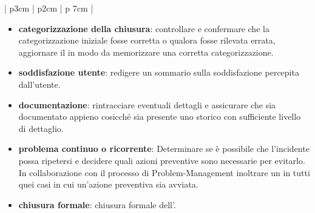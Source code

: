 \begin{center}
\begin{longtable}{| p{3cm} | p{2cm} | p {7cm} |}
\begin{itemize}
\item{\textbf{categorizzazione della chiusura}: controllare e confermare che la categorizzazione iniziale fosse corretta o qualora fosse rilevata errata, aggiornare il  in modo da memorizzare una corretta categorizzazione.}
\item{\textbf{soddisfazione utente}: redigere un sommario sulla soddisfazione percepita dall'utente.}
\item{\textbf{documentazione}: rintracciare eventuali dettagli e assicurare che  sia documentato appieno cosicché sia presente uno storico con sufficiente livello di dettaglio.}
\item{\textbf{problema continuo o ricorrente}: Determinare se è possibile che l'incidente possa ripetersi e decidere quali azioni preventive sono necessarie per evitarlo. In collaborazione con il processo di \ac{Problem-Management} inoltrare un  in tutti quei casi in cui un'azione preventiva sia avviata.}
\item{\textbf{chiusura formale}: chiusura formale dell'.}
\end{itemize}\\
\hline
\end{longtable}
\end{center}























